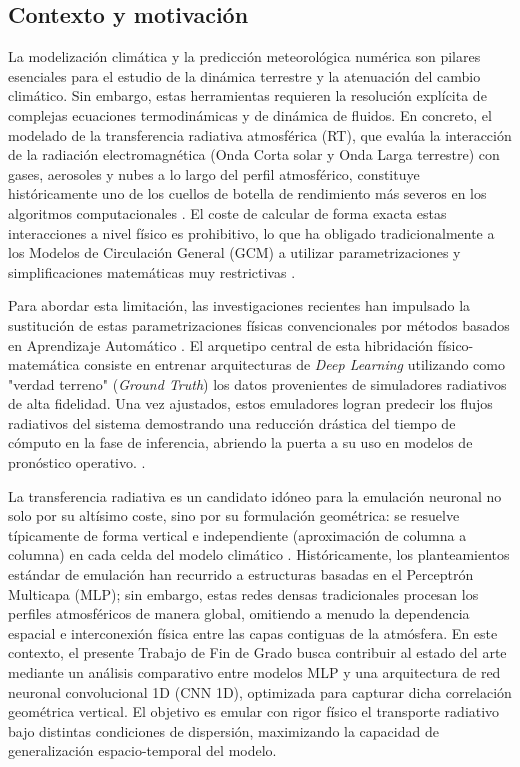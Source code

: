 \documentclass[11pt,a4paper,twoside,pdf]{article}
\numberwithin{equation}{section}
\begin{document}
\subsection{Contexto y motivación}


La modelización climática y la predicción meteorológica numérica son pilares esenciales para el estudio de la dinámica terrestre y la atenuación del cambio climático. Sin embargo, estas herramientas requieren la resolución explícita de complejas ecuaciones termodinámicas y de dinámica de fluidos. En concreto, el modelado de la transferencia radiativa atmosférica (RT), que evalúa la interacción de la radiación electromagnética (Onda Corta solar y Onda Larga terrestre) con gases, aerosoles y nubes a lo largo del perfil atmosférico, constituye históricamente uno de los cuellos de botella de rendimiento más severos en los algoritmos computacionales \cite{Trautmann2020}. El coste de calcular de forma exacta estas interacciones a nivel físico es prohibitivo, lo que ha obligado tradicionalmente a los Modelos de Circulación General (GCM) a utilizar parametrizaciones y simplificaciones matemáticas muy restrictivas \cite{Ukkonen2022}.

Para abordar esta limitación, las investigaciones recientes han impulsado la sustitución de estas parametrizaciones físicas convencionales por métodos basados en Aprendizaje Automático \cite{ClimSim2023}. El arquetipo central de esta hibridación físico-matemática consiste en entrenar arquitecturas de \textit{Deep Learning} utilizando como "verdad terreno" (\textit{Ground Truth}) los datos provenientes de simuladores radiativos de alta fidelidad. Una vez ajustados, estos emuladores logran predecir los flujos radiativos del sistema demostrando una reducción drástica del tiempo de cómputo en la fase de inferencia, abriendo la puerta a su uso en modelos de pronóstico operativo. \cite{Aryandoust2023} \cite{Zhong2023}.

La transferencia radiativa es un candidato idóneo para la emulación neuronal no solo por su altísimo coste, sino por su formulación geométrica: se resuelve típicamente de forma vertical e independiente (aproximación de columna a columna) en cada celda del modelo climático \cite{ClimART2021}. Históricamente, los planteamientos estándar de emulación han recurrido a estructuras basadas en el Perceptrón Multicapa (MLP); sin embargo, estas redes densas tradicionales procesan los perfiles atmosféricos de manera global, omitiendo a menudo la dependencia espacial e interconexión física entre las capas contiguas de la atmósfera. En este contexto, el presente Trabajo de Fin de Grado busca contribuir al estado del arte mediante un análisis comparativo entre modelos MLP y una arquitectura de red neuronal convolucional 1D (CNN 1D), optimizada para capturar dicha correlación geométrica vertical. El objetivo es emular con rigor físico el transporte radiativo bajo distintas condiciones de dispersión, maximizando la capacidad de generalización espacio-temporal del modelo.
\end{document}

